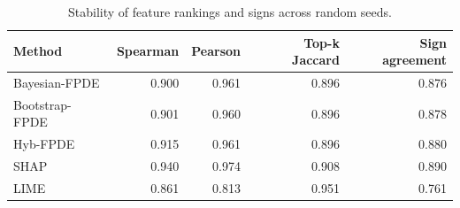 \begin{table}[t]
\centering
\caption{Stability of feature rankings and signs across random seeds.}
\label{tab:stability}
\begin{tabular}{l r r r r}
        \hline
        Method & Spearman & Pearson & Top-k Jaccard & Sign agreement \\
        \hline
        Bayesian-FPDE & 0.900 & 0.961 & 0.896 & 0.876 \\
        Bootstrap-FPDE & 0.901 & 0.960 & 0.896 & 0.878 \\
        Hyb-FPDE & 0.915 & 0.961 & 0.896 & 0.880 \\
        SHAP & 0.940 & 0.974 & 0.908 & 0.890 \\
        LIME & 0.861 & 0.813 & 0.951 & 0.761 \\
        \hline
\end{tabular}
\end{table}
